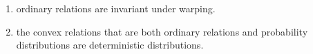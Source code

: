 \documentclass{article}
\begin{document}
\begin{remark}
    \begin{enumerate}
        \item ordinary relations are invariant under warping.
        \item the convex relations that are both ordinary relations and probability distributions are deterministic distributions.
    \end{enumerate}
\end{remark}

\begin{defn}

\end{defn}
\end{document}
